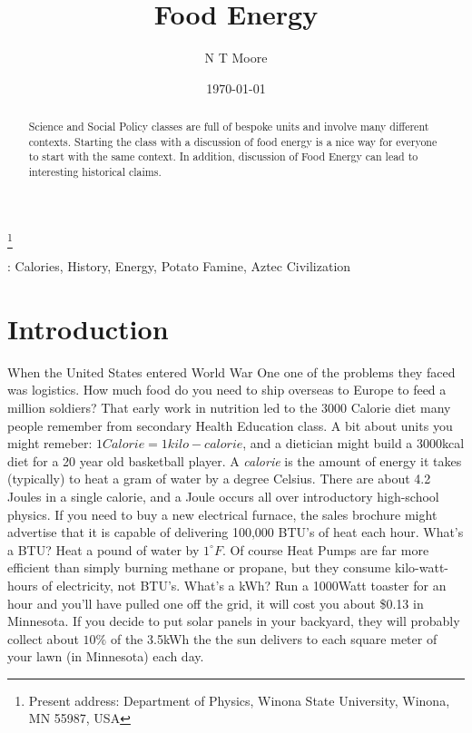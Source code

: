 \documentclass[12pt]{iopart}
\begin{document}
\title[Food Energy]{Food Energy}
\author{N T Moore}
\footnote{Present address:
Department of Physics, Winona State University, Winona, MN 55987, USA}
\date{\today}
\begin{abstract}
Science and Social Policy classes are full of bespoke units and involve many different contexts.  Starting the class with a discussion of food energy is a nice way for everyone to start with the same context.  In addition, discussion of Food Energy can lead to interesting historical claims. 
\end{abstract}
: Calories, History, Energy, Potato Famine, Aztec Civilization
\maketitle

\section{Introduction}
When the United States entered World War One one of the problems they faced was logistics.  How much food do you need to ship overseas to Europe to feed a million soldiers?  That early work in nutrition led to the 3000 Calorie diet many people remember from secondary Health Education class.  A bit about units you might remeber: $1 Calorie = 1 kilo-calorie$, and a dietician might build a 3000kcal diet for a 20 year old basketball player.  A \textit{calorie} is the amount of energy it takes (typically) to heat a gram of water by a degree Celsius.  There are about 4.2 Joules in a single calorie, and a Joule occurs all over introductory high-school physics.  If you need to buy a new electrical furnace, the sales brochure might advertise that it is capable of delivering 100,000 BTU's of heat each hour.  What's a BTU? Heat a pound of water by $1^{\circ}F$.  Of course Heat Pumps are far more efficient than simply burning methane or propane, but they consume kilo-watt-hours of electricity, not BTU's.  What's a kWh?  Run a 1000Watt toaster for an hour and you'll have pulled one off the grid, it will cost you about \$0.13 in Minnesota.  If you decide to put solar panels in your backyard, they will probably collect about $10\%$ of the 3.5kWh the  the sun delivers to each square meter of your lawn (in Minnesota) each day.  
\end{document}
